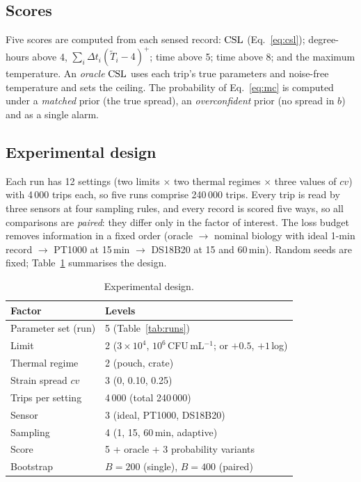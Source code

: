 \subsection{Scores}
Five scores are computed from each sensed record: $\mathrm{CSL}$ (Eq.~\eqref{eq:csl}); degree-hours above 4\degC, $\sum_i\Delta t_i(\tilde T_i-4)^+$; time above 5\degC; time above 8\degC; and the maximum temperature. An \emph{oracle} $\mathrm{CSL}$ uses each trip's true parameters and noise-free temperature and sets the ceiling. The probability of Eq.~\eqref{eq:mc} is computed under a \emph{matched} prior (the true spread), an \emph{overconfident} prior (no spread in $b$) and as a single alarm.

\subsection{Experimental design}
Each run has 12 settings (two limits $\times$ two thermal regimes $\times$ three values of $cv$) with 4\,000 trips each, so five runs comprise 240\,000 trips. Every trip is read by three sensors at four sampling rules, and every record is scored five ways, so all comparisons are \emph{paired}: they differ only in the factor of interest. The loss budget removes information in a fixed order (oracle $\to$ nominal biology with ideal 1-min record $\to$ PT1000 at 15\,min $\to$ DS18B20 at 15 and 60\,min). Random seeds are fixed; Table~\ref{tab:design} summarises the design.

\begin{table}[!htbp]\centering\footnotesize
\caption{Experimental design.}\label{tab:design}
\begin{tabular}{@{}ll@{}}\toprule\rowcolor{dghead}
Factor & Levels\\\midrule
Parameter set (run) & 5 (Table~\ref{tab:runs})\\
Limit & 2 ($3\times10^4$, $10^6$\,CFU\,mL$^{-1}$; or $+0.5$, $+1$\,log)\\
Thermal regime & 2 (pouch, crate)\\
Strain spread $cv$ & 3 (0, 0.10, 0.25)\\
Trips per setting & 4\,000 (total 240\,000)\\
Sensor & 3 (ideal, PT1000, DS18B20)\\
Sampling & 4 (1, 15, 60\,min, adaptive)\\
Score & 5 + oracle + 3 probability variants\\
Bootstrap & $B=200$ (single), $B=400$ (paired)\\
\bottomrule\end{tabular}\end{table}

